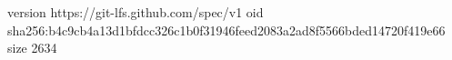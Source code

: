 version https://git-lfs.github.com/spec/v1
oid sha256:b4c9cb4a13d1bfdcc326c1b0f31946feed2083a2ad8f5566bded14720f419e66
size 2634

